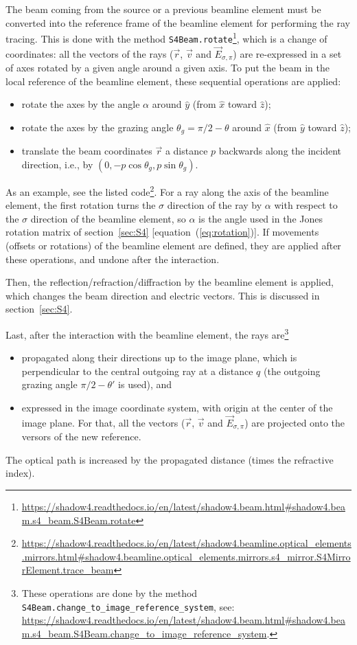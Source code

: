 \documentclass{iucr}
\begin{document}
The beam coming from the source or a previous beamline element must be converted into the reference frame of the beamline element for performing the ray tracing.
This is done with the method {\tt S4Beam.rotate}\footnote{\tiny \url{https://shadow4.readthedocs.io/en/latest/shadow4.beam.html#shadow4.beam.s4_beam.S4Beam.rotate}}, which is a change of coordinates: all the vectors of the rays ($\vec{r}$, $\vec{v}$ and $\vec{E}_{\sigma,\pi}$) are re-expressed in a set of axes rotated by a given angle around a given axis.
To put the beam in the local reference of the beamline element, these sequential operations are applied:
\begin{itemize}
    \item rotate the axes by the angle $\alpha$ around $\hat{y}$ (from $\hat{x}$ toward $\hat{z}$);
    \item rotate the axes by the grazing angle $\theta_g=\pi/2-\theta$ around $\hat{x}$ (from $\hat{y}$ toward $\hat{z}$);
    \item translate the beam coordinates $\vec{r}$ a distance $p$ backwards along the incident direction, i.e., by $(0, -p\cos\theta_g, p\sin\theta_g)$.
\end{itemize}
As an example, see the listed code\footnote{\tiny \url{https://shadow4.readthedocs.io/en/latest/shadow4.beamline.optical_elements.mirrors.html#shadow4.beamline.optical_elements.mirrors.s4_mirror.S4MirrorElement.trace_beam}}.
For a ray along the axis of the beamline element, the first rotation turns the $\sigma$ direction of the ray by $\alpha$ with respect to the $\sigma$ direction of the beamline element, so $\alpha$ is the angle used in the Jones rotation matrix of section~\ref{sec:S4} [equation~(\ref{eq:rotation})].
If movements (offsets or rotations) of the beamline element are defined, they are applied after these operations, and undone after the interaction.

Then, the reflection/refraction/diffraction by the beamline element is applied, which changes the beam direction and electric vectors.
This is discussed in section~\ref{sec:S4}.

Last, after the interaction with the beamline element, the rays are\footnote{
These operations are done by the method {\tt S4Beam.change\_to\_image\_reference\_system}, see: {\tiny \url{https://shadow4.readthedocs.io/en/latest/shadow4.beam.html#shadow4.beam.s4_beam.S4Beam.change_to_image_reference_system}}.
}
\begin{itemize}
    \item propagated along their directions up to the image plane, which is perpendicular to the central outgoing ray at a distance $q$ (the outgoing grazing angle $\pi/2-\theta'$ is used), and
    \item expressed in the image coordinate system, with origin at the center of the image plane. For that, all the vectors ($\vec{r}$, $\vec{v}$ and $\vec{E}_{\sigma,\pi}$) are projected onto the versors of the new reference.
\end{itemize}
The optical path is increased by the propagated distance (times the refractive index).
\end{document}
